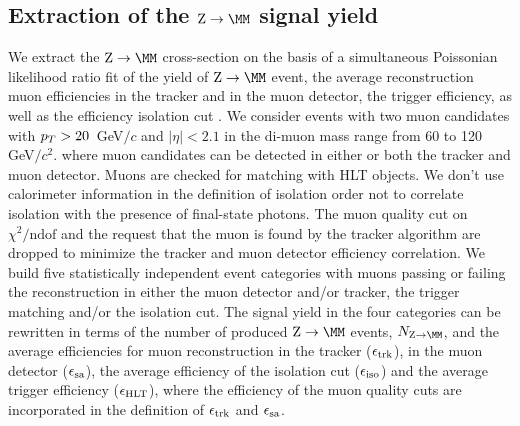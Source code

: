 \subsection{Extraction of the $\Zmm$ signal yield \label{sec:Zmumu}}

We extract the $\Zmm$ cross-section on the basis of a simultaneous
Poissonian likelihood ratio fit of the yield of $\Zmm$ event,
the average reconstruction muon 
efficiencies in the tracker and in the muon detector, the trigger efficiency, 
as well as the efficiency isolation cut
.%
We consider events with two muon candidates with $p_{T}>20$~GeV$/c$ and $|\eta|<2.1$
in the di-muon mass range from 60 to 120 GeV$/c^2$.
where muon candidates can be detected in either or both the tracker and
muon detector. Muons are checked for matching with HLT objects.
We don't use calorimeter information in the definition of isolation 
order not to correlate isolation with the presence of final-state photons.
The muon quality cut on $\chi^2/{\mathrm{ndof}}$ and 
the request that the muon is found by the tracker algorithm are
dropped to minimize the tracker and muon detector efficiency correlation.
We build five statistically independent event categories with muons
passing or failing the reconstruction in either the muon detector and/or tracker,
the trigger matching and/or the isolation cut.
The signal yield in the four categories can be rewritten in terms of the
number of produced $\Zmm$ events, $\NZtomumu$, and the average efficiencies 
for muon reconstruction in the tracker ($\epsilon_\mathrm{trk}$), in the muon detector
($\epsilon_\mathrm{sa}$), the average efficiency of the isolation 
cut ($\epsilon_\mathrm{iso}$) and the average trigger efficiency ($\epsilon_\mathrm{HLT}$),
where the efficiency of the muon quality cuts are incorporated in the definition
of $\epsilon_\mathrm{trk}$ and $\epsilon_\mathrm{sa}$.
%
